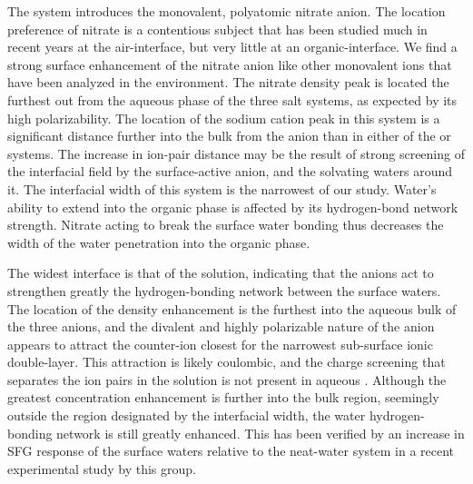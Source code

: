 The \sodnit system introduces the monovalent, polyatomic nitrate anion. The location preference of nitrate is a contentious subject that has been studied much in recent years at the air-\wat interface,\cite{Brown2009,Thomas2007} but very little at an organic-\wat interface. We find a strong surface enhancement of the nitrate anion like other monovalent ions that have been analyzed in the \ctcwat environment.\cite{Wick2007a} The nitrate density peak is located the furthest out from the aqueous phase of the three salt systems, as expected by its high polarizability. The location of the sodium cation peak in this system is a significant distance further into the bulk from the anion than in either of the \nacl or \sodsul systems. The increase in ion-pair distance may be the result of strong screening of the interfacial field by the surface-active anion, and the solvating waters around it. The interfacial width of this system is the narrowest of our study. Water's ability to extend into the organic phase is affected by its hydrogen-bond network strength. Nitrate acting to break the surface water bonding thus decreases the width of the water penetration into the organic phase. 


The widest interface is that of the \sodsul solution, indicating that the \sul anions act to strengthen greatly the hydrogen-bonding network between the surface waters. The location of the \sul density enhancement is the furthest into the aqueous bulk of the three anions, and the divalent and highly polarizable nature of the anion appears to attract the counter-ion closest for the narrowest sub-surface ionic double-layer. This attraction is likely coulombic, and the charge screening that separates the ion pairs in the \sodnit solution is not present in aqueous \sodsul. Although the greatest concentration enhancement is further into the bulk region, seemingly outside the region designated by the interfacial width, the water hydrogen-bonding network is still greatly enhanced. This has been verified by an increase in SFG response of the surface waters relative to the neat-water system in a recent experimental study by this group.\cite{McFearin2009}


